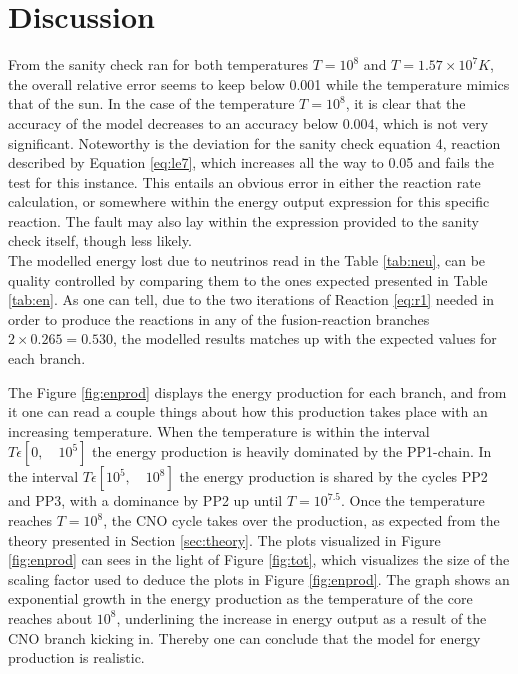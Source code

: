 \documentclass[10pt, nofootinbib, twocolumn]{revtex4-1}
\begin{document}
\section{Discussion}\label{sec:discussion}
From the sanity check ran for both temperatures $T=10^8$ and $T=1.57\times10^7K$, the overall relative error seems to keep below 0.001 while the temperature mimics that of the sun. In the case of the temperature $T=10^8$, it is clear that the accuracy of the model decreases to an accuracy below 0.004, which is not very significant. Noteworthy is the deviation for the sanity check equation 4, reaction described by Equation \eqref{eq:le7}, which increases all the way to 0.05 and fails the test for this instance. This entails an obvious error in either the reaction rate calculation, or somewhere within the energy output expression for this specific reaction. The fault may also lay within the expression provided to the sanity check itself, though less likely. \\

The modelled energy lost due to neutrinos read in the Table \ref{tab:neu}, can be quality controlled by comparing them to the ones expected presented in Table \ref{tab:en}. As one can tell, due to the two iterations of Reaction \eqref{eq:r1} needed in order to produce the reactions in any of the fusion-reaction branches $2\times 0.265=0.530$,  the modelled results matches up with the expected values for each branch. \\
\newpage

The Figure \ref{fig:enprod} displays the energy production for each branch, and from it one can read a couple things about how this production takes place with an increasing temperature. When the temperature is within the interval $T\epsilon [0, \quad 10^{5}]$ the energy production is heavily dominated by the PP1-chain. In the interval $T \epsilon [10^5, \quad 10^{8}]$ the energy production is shared by the cycles PP2 and PP3, with a dominance by PP2 up until $T=10^{7.5}$. Once the temperature reaches $T=10^8$, the CNO cycle takes over the production, as expected from the theory presented in Section \ref{sec:theory}. The plots visualized in Figure \ref{fig:enprod} can sees in the light of Figure \ref{fig:tot}, which visualizes the size of the scaling factor used to deduce the plots in Figure \ref{fig:enprod}. The graph shows an exponential growth in the energy production as the temperature of the core reaches about $10^8$, underlining the increase in energy output as a result of the CNO branch kicking in. Thereby one can conclude that the model for energy production is realistic. \\
\end{document}
